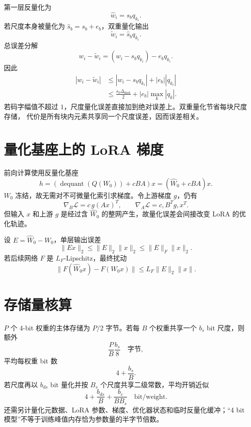\documentclass[11pt]{article}
\numberwithin{equation}{section}
\newcommand{\1}{\mathbf{1}}
\newcommand{\cL}{\mathcal{L}}
\begin{document}
第一层反量化为
\begin{equation}
 \widehat w_i=s_bq_{k_i}.
\end{equation}
若尺度本身被量化为 $\widehat s_b=s_b+e_b$，双重量化输出
\begin{equation}
 \widetilde w_i=\widehat s_bq_{k_i}.
\end{equation}
总误差分解
\begin{equation}
 w_i-\widetilde w_i
 =(w_i-s_bq_{k_i})-e_bq_{k_i}.
\end{equation}
因此
\begin{align}
 |w_i-\widetilde w_i|
 &\le |w_i-s_bq_{k_i}|+|e_b||q_{k_i}|\\
 &\le\frac{s_b\Delta_{\max}}2+|e_b|\max_k|q_k|.
\end{align}
若码字幅值不超过 $1$，尺度量化误差直接加到绝对误差上。双重量化节省每块尺度存储，
代价是所有块内元素共享同一个尺度误差，因而误差相关。

\section{量化基座上的 LoRA 梯度}

前向计算使用反量化基座
\begin{equation}
 h=(\operatorname{dequant}(Q(W_0))+cBA)x
 =(\widehat W_0+cBA)x.
\end{equation}
$W_0$ 冻结，故无需对不可微量化索引求梯度。令上游梯度 $g$，仍有
\begin{equation}
 \nabla_B\cL=c\,g(Ax)^T,\qquad
 \nabla_A\cL=c,B^Tg,x^T.
\end{equation}
但输入 $x$ 和上游 $g$ 是经过含 $\widehat W_0$ 的整网产生，故量化误差会间接改变 LoRA 的优化轨迹。

设 $E=\widehat W_0-W_0$，单层输出误差
\begin{equation}
 \|Ex\|_2\le\|E\|_2\|x\|_2\le\|E\|_F\|x\|_2.
\end{equation}
若后续网络 $F$ 是 $L_F$-Lipschitz，最终扰动
\begin{equation}
 \|F(\widehat W_0x)-F(W_0x)\|
 \le L_F\|E\|_2\|x\|.
\end{equation}

\section{存储量核算}

$P$ 个 4-bit 权重的主体存储为 $P/2$ 字节。若每 $B$ 个权重共享一个
$b_s$ bit 尺度，则额外
\begin{equation}
 \frac PB\frac{b_s}{8}\quad\text{字节},
\end{equation}
平均每权重 bit 数
\begin{equation}
 4+\frac{b_s}{B}.
\end{equation}
若尺度再以 $b_{ds}$ bit 量化并按 $B_s$ 个尺度共享二级常数，平均开销近似
\begin{equation}
 4+\frac{b_{ds}}{B}+\frac{b_c}{BB_s}\quad\text{bit/weight}.
\end{equation}
还需另计量化元数据、LoRA 参数、梯度、优化器状态和临时反量化缓冲；“4 bit 模型”不等于训练峰值内存恰为参数量的半字节倍数。
\end{document}
